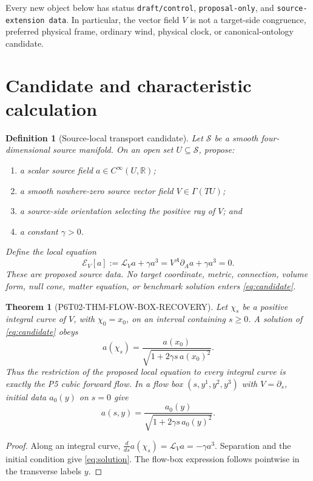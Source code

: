 \documentclass[11pt]{article}
\newtheorem{definition}{Definition}
\newtheorem{theorem}{Theorem}
\newcommand{\Sub}{\mathcal S}
\newcommand{\Lie}{\mathcal L}
\begin{document}
Every new object below has status
\texttt{draft/control}, \texttt{proposal-only}, and
\texttt{source-extension data}.  In particular, the vector field \(V\) is
not a target-side congruence, preferred physical frame, ordinary wind,
physical clock, or canonical-ontology candidate.

\section{Candidate and characteristic calculation}

\begin{definition}[Source-local transport candidate]
\label{def:candidate}
Let \(\Sub\) be a smooth four-dimensional source manifold.  On an open set
\(U\subseteq\Sub\), propose:
\begin{enumerate}
  \item a scalar source field \(a\in C^\infty(U,\mathbb R)\);
  \item a smooth nowhere-zero source vector field \(V\in\Gamma(TU)\);
  \item a source-side orientation selecting the positive ray of \(V\); and
  \item a constant \(\gamma>0\).
\end{enumerate}
Define the local equation
\[
 \mathcal E_V[a]
 :=\Lie_Va+\gamma a^3
 =V^A\partial_Aa+\gamma a^3=0.
\tag{1}\label{eq:candidate}
\]
These are proposed source data.  No target coordinate, metric, connection,
volume form, null cone, matter equation, or benchmark solution enters
\eqref{eq:candidate}.
\end{definition}

\begin{theorem}[P6T02-THM-FLOW-BOX-RECOVERY]
\label{thm:flowbox}
Let \(\chi_s\) be a positive integral curve of \(V\), with
\(\chi_0=x_0\), on an interval containing \(s\geq0\).  A solution of
\eqref{eq:candidate} obeys
\[
 a(\chi_s)
 =\frac{a(x_0)}{\sqrt{1+2\gamma s\,a(x_0)^2}}.
\tag{2}\label{eq:solution}
\]
Thus the restriction of the proposed local equation to every integral curve
is exactly the P5 cubic forward flow.  In a flow box
\((s,y^1,y^2,y^3)\) with \(V=\partial_s\), initial data \(a_0(y)\) on
\(s=0\) give
\[
 a(s,y)=\frac{a_0(y)}
 {\sqrt{1+2\gamma s\,a_0(y)^2}}.
\tag{3}\label{eq:flowboxsolution}
\]
\end{theorem}

\begin{proof}
Along an integral curve,
\(\frac{d}{ds}a(\chi_s)=\Lie_Va=-\gamma a^3\).  Separation and the
initial condition give \eqref{eq:solution}.  The flow-box expression follows
pointwise in the transverse labels \(y\).
\end{proof}
\end{document}
